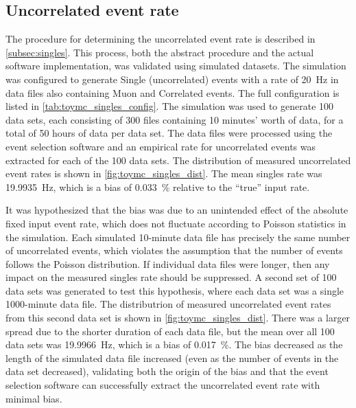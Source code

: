 \subsection{Uncorrelated event rate}

The procedure for determining the uncorrelated event rate
is described in \cref{subsec:singles}.
This process, both the abstract procedure and the actual software implementation,
was validated using simulated datasets.
The simulation was configured to generate Single (uncorrelated) events
with a rate of \SI{20}{\Hz}
in data files also containing Muon and Correlated events.
The full configuration is listed in \cref{tab:toymc_singles_config}.
The simulation was used to generate 100 data sets,
each consisting of 300 files containing 10 minutes' worth of data,
for a total of 50 hours of data per data set.
The data files were processed using the event selection software
and an empirical rate for uncorrelated events was extracted
for each of the 100 data sets.
The distribution of measured uncorrelated event rates
is shown in \cref{fig:toymc_singles_dist}.
The mean singles rate was \SI{19.9935}{\Hz},
which is a bias of \SI{0.033}{\percent} relative to the ``true'' input rate.

It was hypothesized that the bias was due to an unintended effect
of the absolute fixed input event rate,
which does not fluctuate according to Poisson statistics in the simulation.
Each simulated 10-minute data file has precisely the same number of uncorrelated events,
which violates the assumption that the number of events follows the Poisson distribution.
If individual data files were longer, then any impact on the measured singles rate
should be suppressed.
A second set of 100 data sets was generated to test this hypothesis,
where each data set was a single 1000-minute data file.
The distributrion of measured uncorrelated event rates from this second data set
is shown in \cref{fig:toymc_singles_dist}.
There was a larger spread due to the shorter duration of each data file,
but the mean over all 100 data sets was \SI{19.9966}{\Hz},
which is a bias of \SI{0.017}{\percent}.
The bias decreased as the length of the simulated data file increased
(even as the number of events in the data set decreased),
validating both the origin of the bias
and that the event selection software can successfully extract
the uncorrelated event rate with minimal bias.

